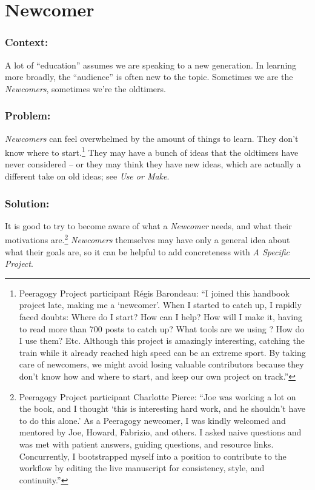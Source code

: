 \section{Newcomer}
\subsubsection*{Context:}
A lot of ``education'' assumes we are speaking to a new generation. 
In learning more broadly, the ``audience'' is often new to the topic.
Sometimes we are the \emph{Newcomers}, sometimes we're the oldtimers.

\subsubsection*{Problem:} \emph{Newcomers} can feel overwhelmed by the amount of things to learn.  They
don't know where to start.\footnote{Peeragogy Project participant
R\'egis Barondeau: ``I joined this handbook project late, making me
a `newcomer'. When I started to catch up, I rapidly faced doubts:
Where do I start? How can I help? How will I make it, having to read
more than 700 posts to catch up? What tools are we using ? How do I use
them? Etc. Although this project is amazingly interesting, catching the
train while it already reached high speed can be an extreme sport. By
taking care of newcomers, we might avoid losing valuable contributors
because they don't know how and where to start, and keep our own project
on track.''}  They may have a bunch of ideas that the oldtimers have
never considered -- or they may think they have new ideas, which are actually
a different take on old ideas; see \emph{Use or Make}.

\subsubsection*{Solution:} It is good to try to become aware of what a \emph{Newcomer}
needs, and what their motivations are.\footnote{Peeragogy Project participant
Charlotte Pierce: ``Joe was working a lot on the book, and I thought
`this is interesting hard work, and he shouldn't have to do
this alone.' As a Peeragogy newcomer, I was kindly welcomed and
mentored by Joe, Howard, Fabrizio, and others. I asked naive questions
and was met with patient answers, guiding questions, and resource links.
Concurrently, I bootstrapped myself into a position to contribute to the
workflow by editing the live manuscript for consistency, style, and continuity.''}
\emph{Newcomers} themselves may have only a general idea about what their goals are, so it can be
helpful to add concreteness with \emph{A Specific Project}.

